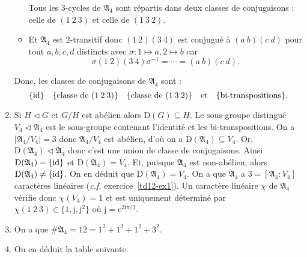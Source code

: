 \documentclass[./main]{subfiles}
\begin{document}
\begin{enumerate}
\begin{itemize}
           Tous les $3$-cycles de $\mathfrak{A}_4$ sont répartis dans deux classes de conjugaisons : celle de  $(1\:2\:3)$ et celle de  $(1\:3\:2)$.

         \item Et $\mathfrak{A}_4$ est  $2$-transitif donc $(1\:2)(3\:4)$ est conjugué à  $(a\:b)(c\:d)$ pour tout  $a,b,c,d$ distincts
           avec  $\sigma : 1 \mapsto a, 2 \mapsto b$ car  \[
           \sigma (1\:2)(3\:4) \sigma^{-1} = \cdots = (a\:b)(c\:d)
           .\]
      \end{itemize}
      Donc, les classes de conjugaisons de $\mathfrak{A}_4$ sont :
      \[
      \{\operatorname{id}\} \quad \{\text{classe de }(1\:2\:3)\}  \quad \{\text{classe de }(1\:3\:2)\} \quad \text{et} \quad \{\text{bi-transpositions}\} 
      .\]
    \item Si $H \triangleleft G$ et $G / H$ est abélien alors $\mathrm{D}(G) \subseteq H$.
      Le sous-groupe distingué $V_4 \triangleleft \mathfrak{A}_4$ est le sous-groupe contenant l'identité et les bi-transpositions.
      On a $|\mathfrak{A}_4 / V_4| = 3$ donc $\mathfrak{A}_4 / V_4$ est abélien, d'où on a $ \mathrm{D}(\mathfrak{A}_4) \subseteq V_4$.
      Or, $\mathrm{D}(\mathfrak{A}_4) \triangleleft \mathfrak{A}_4$ donc c'est une union de classe de conjugaisons.
      Ainsi $\mathrm{D}(\mathfrak{A}_4) = \{\operatorname{id}\}$ et $\mathrm{D}(\mathfrak{A}_4) = V_4$.
      Et, puisque $\mathfrak{A}_4$ est non-abélien, alors  $\mathrm{D}(\mathfrak{A}_4) \neq \{\operatorname{id}\}$.
      On en déduit que $\mathrm{D}(\mathfrak{A}_4) = V_4$.
      On a que $\mathfrak{A}_4$ a  $3 = [\mathfrak{A}_4 : V_4]$ caractères linéaires (\textit{c.f.} exercice~\ref{td12-ex1}).
      Un caractère linéaire $\chi$ de $\mathfrak{A}_4$ vérifie donc  $\chi(V_4) = 1$ et est uniquement déterminé par  $\chi(1\:2\:3) \in \{1,\mathrm{j}, \mathrm{j}^2\}$ où $\mathrm{j} = \mathrm{e}^{2 \mathrm{i} \pi / 3}$.
    \item On a que $\# \mathfrak{A}_4 = 12 = 1^2 + 1^2 + 1^2 + 3^2$.
    \item On en déduit la table suivante.
  \end{enumerate}
\end{document}
